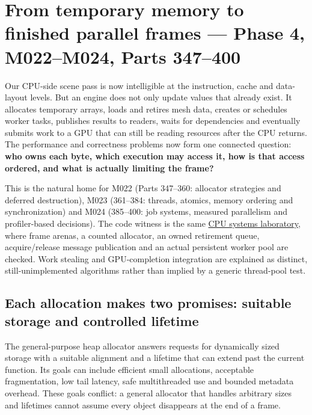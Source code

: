 \section{From temporary memory to finished parallel frames --- Phase 4, M022--M024, Parts 347--400}\label{05-engine-i-ch007-from-temporary-memory-to-finished-parallel-frames-phase-4-m022m024-parts-347400}

Our CPU-side scene pass is now intelligible at the instruction, cache and data-layout levels. But an engine does not only update values that already exist. It allocates temporary arrays, loads and retires mesh data, creates or schedules worker tasks, publishes results to readers, waits for dependencies and eventually submits work to a GPU that can still be reading resources after the CPU returns. The performance and correctness problems now form one connected question: \textbf{who owns each byte, which execution may access it, how is that access ordered, and what is actually limiting the frame?}

This is the natural home for M022 (Parts 347--360: allocator strategies and deferred destruction), M023 (361--384: threads, atomics, memory ordering and synchronization) and M024 (385--400: job systems, measured parallelism and profiler-based decisions). The code witness is the same \href{tools/labs/phase4_cpu_systems_lab.cpp}{CPU systems laboratory}, where frame arenas, a counted allocator, an owned retirement queue, acquire/release message publication and an actual persistent worker pool are checked. Work stealing and GPU-completion integration are explained as distinct, still-unimplemented algorithms rather than implied by a generic thread-pool test.

\subsection{Each allocation makes two promises: suitable storage and controlled lifetime}\label{05-engine-i-ch007-each-allocation-makes-two-promises-suitable-storage-and-controlled-lifetime}

The general-purpose heap allocator answers requests for dynamically sized storage with a suitable alignment and a lifetime that can extend past the current function. Its goals can include efficient small allocations, acceptable fragmentation, low tail latency, safe multithreaded use and bounded metadata overhead. These goals conflict: a general allocator that handles arbitrary sizes and lifetimes cannot assume every object disappears at the end of a frame.

